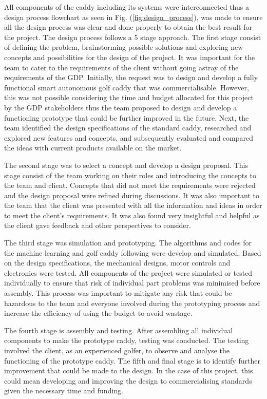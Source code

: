 \documentclass[11pt,landscape]{article}
\begin{document}
\begin{multicols}{2}
All components of the caddy including its systems were interconnected thus a
design process flowchart as seen in Fig. (\ref{fig:design_process}), was made to
ensure all the design process was clear and done properly to obtain the best
result for the project. The design process follows a 5 stage approach. The first
stage consist of defining the problem, brainstorming possible solutions and
exploring new concepts and possibilities for the design of the project. It was
important for the team to cater to the requirements of the client without going
astray of the requirements of the GDP. Initially, the request was to design and
develop a fully functional smart autonomous golf caddy that was
commercialisable. However, this was not possible considering the time and budget
allocated for this project by the GDP stakeholders thus the team proposed to
design and develop a functioning prototype that could be further improved in the
future. Next, the team identified the design specifications of the standard
caddy, researched and explored new features and concepts, and subsequently
evaluated and compared the ideas with current products available on the market. 


The second stage was to select a concept and develop a design proposal. This
stage consist of the team working on their roles and introducing the concepts to the
team and client. Concepts that did not meet the requirements were rejected and
the design proposal were refined during discussions. It was also important to
the team that the client was presented with all the information and ideas in
order to meet the client’s requirements. It was also found very insightful and
helpful as the client gave feedback and other perspectives to consider. 

The third stage was simulation and prototyping. The algorithms and codes for the
machine learning and golf caddy following were develop and simulated. Based on
the design specifications, the mechanical designs, motor controls and
electronics were tested. All components of the project were simulated or tested
individually to ensure that risk of individual part problems was minimised
before assembly. This process was important to mitigate any risk that could be
hazardous to the team and everyone involved during the prototyping process and
increase the efficiency of using the budget to avoid wastage. 

The fourth stage is assembly and testing. After assembling all individual
components to make the prototype caddy, testing was conducted. The testing
involved the client, as an experienced golfer, to observe and analyse the
functioning of the prototype caddy. The fifth and
final stage is to identify further improvement that could be made to the design.
In the case of this project, this could mean developing and improving the design
to commercialising standards given the necessary time and funding. 


\end{multicols}
\end{document}
